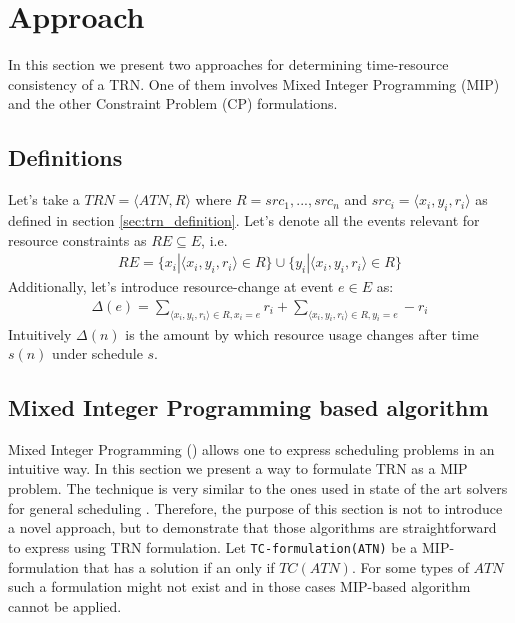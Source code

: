 \section{Approach}
In this section we present two approaches for determining time-resource consistency of a TRN. One of them involves Mixed Integer Programming (MIP) and the other Constraint Problem (CP) formulations.
\subsection{Definitions}
Let's take a $TRN=\langle ATN, R \rangle$ where $R={src_1, ..., src_n}$ and $src_i = \langle x_i, y_i, r_i \rangle$ as defined in section \ref{sec:trn_definition}. Let's denote all the events relevant for resource constraints as $RE \subseteq E$, i.e.
\begin{align*}
RE = \{ x_i | \langle x_i, y_i, r_i \rangle \in R \} \cup \{ y_i | \langle x_i, y_i, r_i \rangle \in R \}
\end{align*}
Additionally, let's introduce resource-change at event $e \in E$ as:
\begin{align*}
\Delta(e) = \sum_{\langle x_i, y_i, r_i \rangle \in R, x_i = e} r_i + \sum_{ \langle x_i, y_i, r_i \rangle \in R, y_i = e} -r_i
\end{align*}
Intuitively $\Delta(n)$ is the amount by which resource usage changes after time $s(n)$ under schedule $s$.

\subsection{Mixed Integer Programming based algorithm}
Mixed Integer Programming (\cite{markowitz1957solution}) allows one to express scheduling problems in an intuitive way. In this section we present a way to formulate TRN as a MIP problem. The technique is very similar to the ones used in state of the art solvers for general scheduling  \cite{patterson1984comparison} \cite{bartusch1988scheduling}. Therefore, the purpose of this section is not to introduce a novel approach, but to demonstrate that those algorithms are straightforward to express using TRN formulation. Let \texttt{TC-formulation(ATN)} be a MIP-formulation that has a solution if an only if $TC(ATN)$. For some types of $ATN$ such a formulation might not exist and in those cases MIP-based algorithm cannot be applied.

